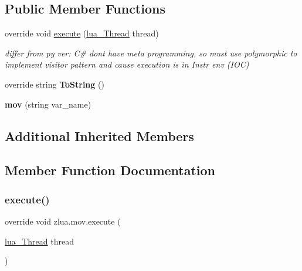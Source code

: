 \subsection*{Public Member Functions}
\begin{DoxyCompactItemize}
\item 
override void \mbox{\hyperlink{classzlua_1_1mov_a729d173bb798f765ed20aabcfaf2f63c}{execute}} (\mbox{\hyperlink{classzlua_1_1lua___thread}{lua\+\_\+\+Thread}} thread)
\begin{DoxyCompactList}\small\item\em differ from py ver\+: C\# dont have meta programming, so must use polymorphic to implement visitor pattern and cause execution is in Instr env (I\+OC) \end{DoxyCompactList}\item 
\mbox{\label{classzlua_1_1mov_aa3978dc1bdda57d553a9d99a0104b336}} 
override string {\bfseries To\+String} ()
\item 
\mbox{\label{classzlua_1_1mov_a6a5c59944ace654350aa1a97486a01d5}} 
{\bfseries mov} (string var\+\_\+name)
\end{DoxyCompactItemize}
\subsection*{Additional Inherited Members}


\subsection{Member Function Documentation}
\mbox{\label{classzlua_1_1mov_a729d173bb798f765ed20aabcfaf2f63c}} 
\subsubsection{\texorpdfstring{execute()}{execute()}}
{\footnotesize\ttfamily override void zlua.\+mov.\+execute (\begin{DoxyParamCaption}\item[{\mbox{\hyperlink{classzlua_1_1lua___thread}{lua\+\_\+\+Thread}}}]{thread }\end{DoxyParamCaption})\hspace{0.3cm}{\ttfamily [virtual]}}



